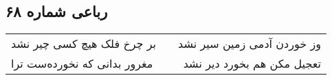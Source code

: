 \begin{center}
\section*{رباعی شماره ۶۸}
\label{sec:sh068}
\begin{longtable}{l p{0.5cm} r}
بر چرخ فلک هیچ کسی چیر نشد
&&
وز خوردن آدمی زمین سیر نشد
\\
مغرور بدانی که نخورده‌ست ترا
&&
تعجیل مکن هم بخورد دیر نشد
\\
\end{longtable}
\end{center}
